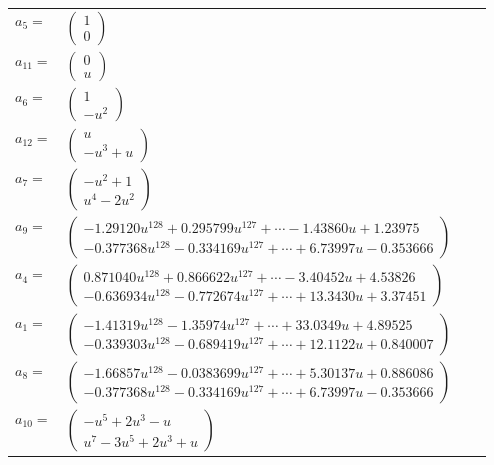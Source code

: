 \documentclass[1p]{elsarticle_modified}
\theoremstyle{definition}
\begin{document}
\begin{tabular}{m{7pt} m{180pt} m{7pt} m{180pt} }
\flushright $a_{5}=$&$\begin{pmatrix}1\\0\end{pmatrix}$ \\
\flushright $a_{11}=$&$\begin{pmatrix}0\\u\end{pmatrix}$ \\
\flushright $a_{6}=$&$\begin{pmatrix}1\\- u^2\end{pmatrix}$ \\
\flushright $a_{12}=$&$\begin{pmatrix}u\\- u^3+u\end{pmatrix}$ \\
\flushright $a_{7}=$&$\begin{pmatrix}- u^2+1\\u^4-2 u^2\end{pmatrix}$ \\
\flushright $a_{9}=$&$\begin{pmatrix}-1.29120 u^{128}+0.295799 u^{127}+\cdots-1.43860 u+1.23975\\-0.377368 u^{128}-0.334169 u^{127}+\cdots+6.73997 u-0.353666\end{pmatrix}$ \\
\flushright $a_{4}=$&$\begin{pmatrix}0.871040 u^{128}+0.866622 u^{127}+\cdots-3.40452 u+4.53826\\-0.636934 u^{128}-0.772674 u^{127}+\cdots+13.3430 u+3.37451\end{pmatrix}$ \\
\flushright $a_{1}=$&$\begin{pmatrix}-1.41319 u^{128}-1.35974 u^{127}+\cdots+33.0349 u+4.89525\\-0.339303 u^{128}-0.689419 u^{127}+\cdots+12.1122 u+0.840007\end{pmatrix}$ \\
\flushright $a_{8}=$&$\begin{pmatrix}-1.66857 u^{128}-0.0383699 u^{127}+\cdots+5.30137 u+0.886086\\-0.377368 u^{128}-0.334169 u^{127}+\cdots+6.73997 u-0.353666\end{pmatrix}$ \\
\flushright $a_{10}=$&$\begin{pmatrix}- u^5+2 u^3- u\\u^7-3 u^5+2 u^3+u\end{pmatrix}$ \\

\end{tabular}
\end{document}
